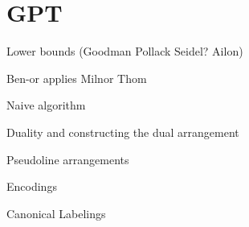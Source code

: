 \chapter{GPT}





Lower bounds (Goodman Pollack Seidel? Ailon)

Ben-or applies Milnor Thom

Naive algorithm

Duality and constructing the dual arrangement

Pseudoline arrangements

Encodings

Canonical Labelings
